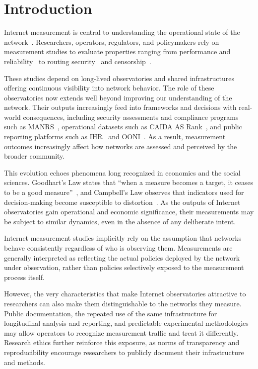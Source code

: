 \documentclass[sigconf, 10pt]{acmart}
\begin{document}
\maketitle

\section{Introduction}

Internet measurement is central to understanding the operational state of the network~\cite{clark}. Researchers, operators, regulators, and policymakers rely on measurement studies to evaluate properties ranging from performance and reliability~\cite{zoom,mlab} to routing security~\cite{rscope,friends,aspa,randy,rovista} and censorship~\cite{CenRL,iris,censoredplanet,bashir}. 

These studies depend on long-lived observatories and shared infrastructures offering continuous visibility into network behavior.
The role of these observatories now extends well beyond improving our understanding of the network. Their outputs increasingly feed into frameworks and decisions with real-world consequences, including security assessments and compliance programs such as MANRS~\cite{manrs}, operational datasets such as CAIDA AS Rank~\cite{caida_asrank}, and public reporting platforms such as IHR~\cite{ihr} and OONI~\cite{ooni}. 
As a result, measurement outcomes increasingly affect how networks are assessed and perceived by the broader community.

This evolution echoes phenomena long recognized in economics and the social sciences. Goodhart's Law states that ``when a measure becomes a target, it ceases to be a good measure''~\cite{goodhart}, and Campbell's Law observes that indicators used for decision-making become susceptible to distortion~\cite{campbell}. As the outputs of Internet observatories gain operational and economic significance, their measurements may be subject to similar dynamics, even in the absence of any deliberate intent.

Internet measurement studies implicitly rely on the assumption that networks behave consistently regardless of who is observing them. Measurements are generally interpreted as reflecting the actual policies deployed by the network under observation, rather than policies selectively exposed to the measurement process itself.

However, the very characteristics that make Internet observatories attractive to researchers can also make them distinguishable to the networks they measure. Public documentation, the repeated use of the same infrastructure for longitudinal analysis and reporting, and predictable experimental methodologies may allow operators to recognize measurement traffic and treat it differently. Research ethics further reinforce this exposure, as norms of transparency and reproducibility encourage researchers to publicly document their infrastructure and methods.
\end{document}
